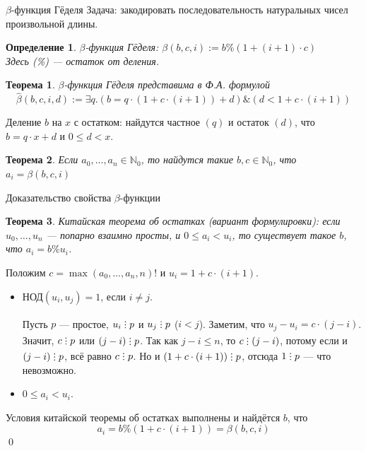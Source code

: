 \documentclass[aspectratio=169]{beamer}
\newtheorem{thm}{Теорема}[section]
\newtheorem{dfn}{Определение}[section]
\newcommand{\divisible}%
{\mathrel{\lower.2ex%
\vbox{\baselineskip=0.7ex\lineskiplimit=0pt%
\kern6pt \hbox{.}\hbox{.}\hbox{.}}%
}}
\begin{document}
\begin{frame}{$\beta$-функция Гёделя}
Задача: закодировать последовательность натуральных чисел произвольной длины.\pause
\begin{dfn}$\beta$-функция Гёделя: $\mathcal{\beta}(b,c,i) := b \% (1 + (i+1) \cdot c)$\\
Здесь (\%) --- остаток от деления.
\end{dfn}\pause
\begin{thm}$\beta$-функция Гёделя представима в Ф.А. формулой
$$\hat{\beta}(b,c,i,d) := \exists q.(b = q \cdot (1 + c \cdot (i+1)) + d) \& (d < 1 + c \cdot (i+1))$$
\end{thm}\pause\vspace{-0.3cm}
Деление $b$ на $x$ с остатком: найдутся частное $(q)$ и остаток $(d)$, что
$b = q\cdot x + d$ и $0 \le d < x$.
\pause
\begin{thm}Если $a_0, \dots, a_n \in \mathbb{N}_0$, то найдутся такие $b,c \in \mathbb{N}_0$, что
$a_i = \beta(b,c,i)$
\end{thm}
\end{frame}

\begin{frame}{Доказательство свойства $\beta$-функции}
\begin{thm}Китайская теорема об остатках (вариант формулировки): если $u_0, \dots, u_n$ --- попарно 
взаимно просты, и $0 \le a_i < u_i$, то существует такое $b$, что $a_i = b \% u_i$.
\end{thm}\pause
Положим $c = \max(a_0,\dots,a_n,n)!$ и $u_i = 1+c\cdot(i+1)$.\pause
\begin{itemize}
\item $\text{НОД}(u_i,u_j) = 1$, если $i \ne j$.\pause

Пусть $p$ --- простое, $u_i\divisible p$ и $u_j\divisible p$ ($i < j$). \pause
Заметим, что $u_j-u_i = c \cdot (j-i)$. Значит, $c\divisible p$ или $(j-i)\divisible p$. \pause
Так как $j-i \le n$, то $c \divisible (j-i)$, потому если и $(j-i)\divisible p$, всё равно $c \divisible p$. \pause
Но и $(1+c\cdot(i+1))\divisible p$, отсюда $1 \divisible p$ --- что невозможно. \pause
\item $0 \le a_i < u_i$.\pause
\end{itemize}
Условия китайской теоремы об остатках выполнены и найдётся $b$, что \vspace{-0.2cm}
$$a_i = b \% (1 + c\cdot(i+1)) = \beta(b,c,i)$$
\qed
\end{frame}
\end{document}
